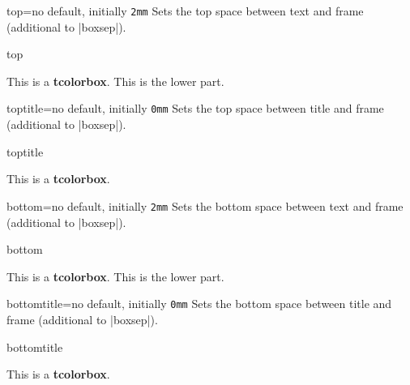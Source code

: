 \begin{docTcbKey}{top}{=}{no default, initially \texttt{2mm}}
  Sets the top space between text and frame (additional to |boxsep|).
\begin{exdispExample}{top}

\begin{tcolorbox}[top=0mm]
This is a \textbf{tcolorbox}.
\tcblower
This is the lower part.
\end{tcolorbox}
\end{exdispExample}
\end{docTcbKey}


\begin{docTcbKey}{toptitle}{=}{no default, initially \texttt{0mm}}
  Sets the top space between title and frame (additional to |boxsep|).
\begin{exdispExample}{toptitle}

\begin{tcolorbox}[toptitle=3mm,title=My title]
This is a \textbf{tcolorbox}.
\end{tcolorbox}
\end{exdispExample}
\end{docTcbKey}

\clearpage
\begin{docTcbKey}{bottom}{=}{no default, initially \texttt{2mm}}
  Sets the bottom space between text and frame (additional to |boxsep|).
\begin{exdispExample}{bottom}

\begin{tcolorbox}[bottom=0mm]
This is a \textbf{tcolorbox}.
\tcblower
This is the lower part.
\end{tcolorbox}
\end{exdispExample}
\end{docTcbKey}

\begin{docTcbKey}{bottomtitle}{=}{no default, initially \texttt{0mm}}
  Sets the bottom space between title and frame (additional to |boxsep|).
\begin{exdispExample}{bottomtitle}

\begin{tcolorbox}[bottomtitle=3mm,title=My title]
This is a \textbf{tcolorbox}.
\end{tcolorbox}
\end{exdispExample}
\end{docTcbKey}


